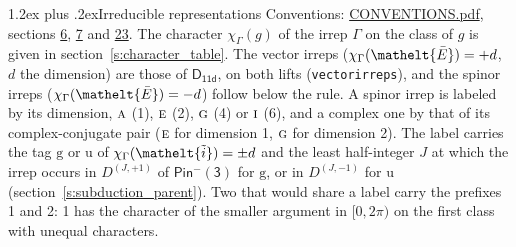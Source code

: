 \documentclass[10pt,a4paper]{article}
\makeatletter
\renewcommand\section{\@startsection{section}{1}{\z@}{-3ex plus -1ex minus -.2ex}%
  {1.2ex plus .2ex}{\normalfont\large\sffamily\bfseries\color{parttitle}}}
\numberwithin{equation}{section}
\newcommand{\eltfont}[1]{{\let\sigma\eltsigma\mathelt{#1}}}
\newcommand{\grp}[1]{\mathsf{#1}}
\newcommand{\irr}[1]{\text{\normalfont\scshape #1}}
\newcommand{\elt}[1]{\eltfont{#1}}
\newcommand{\ptag}[1]{\mathrm{#1}}
\newcommand{\irrJp}[2]{D^{(#1,#2)}}
\newcommand{\irchar}[1]{\chi_{#1}}
\newcommand{\barred}[1]{\bar{#1}}
\newcommand{\lift}[1]{\tilde{#1}}
\makeatother
\begin{document}
\section{Irreducible representations}\label{s:irreps}
Conventions: \href{../../CONVENTIONS.pdf}{CONVENTIONS.pdf}, sections \href{../../../rotation/CONVENTIONS.pdf\#conv.6}{6}, \href{../../../rotation/CONVENTIONS.pdf\#conv.7}{7} and \href{../../CONVENTIONS.pdf\#conv.23}{23}.
\leavevmode\label{n:function.character}\label{n:irrep.Gamma}The character $\irchar{\Gamma}(g)$ of the irrep $\Gamma$ on the class of $g$ is given in section~\ref{s:character_table}. \label{n:index.dimension}The vector irreps ($\irchar{\Gamma}(\elt{\barred{E}}) = +d$, $d$ the dimension) are those of \href{../../../rotation/data/pdf/D11d.pdf}{$\grp{D_{11d}}$}, on both lifts (\texttt{vectorirreps}), and the spinor irreps ($\irchar{\Gamma}(\elt{\barred{E}}) = -d$) follow below the rule. A spinor irrep is labeled by its dimension, $\irr{a}$ (1), $\irr{e}$ (2), $\irr{g}$ (4) or $\irr{i}$ (6), and a complex one by that of its complex-conjugate pair ($\irr{e}$ for dimension 1, $\irr{g}$ for dimension 2). The label carries the tag $\ptag{g}$ or $\ptag{u}$ of $\irchar{\Gamma}(\elt{\lift{i}}) = \pm d$ and the least half-integer $J$ at which the irrep occurs in $\irrJp{J}{+1}$ of $\grp{Pin^{-}(3)}$ for $\ptag{g}$, or in $\irrJp{J}{-1}$ for $\ptag{u}$ (section~\ref{s:subduction_parent}). Two that would share a label carry the prefixes 1 and 2: 1 has the character of the smaller argument in $[0, 2\pi)$ on the first class with unequal characters.
\end{document}

